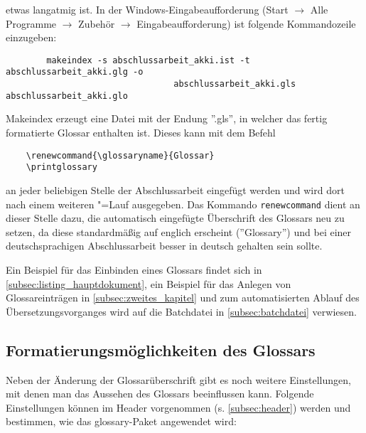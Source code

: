 etwas langatmig ist. In der Windows-Eingabeaufforderung (Start $\rightarrow$ Alle Programme
$\rightarrow$ Zubehör $\rightarrow$ Eingabeaufforderung) ist folgende Kommandozeile einzugeben:
\begin{verbatim}
		makeindex -s abschlussarbeit_akki.ist -t abschlussarbeit_akki.glg -o
								 abschlussarbeit_akki.gls abschlussarbeit_akki.glo
\end{verbatim}
Makeindex erzeugt eine Datei mit der Endung ''.gls'', in welcher das fertig formatierte Glossar
enthalten ist. Dieses kann mit dem Befehl
\begin{verbatim}
	\renewcommand{\glossaryname}{Glossar}
	\printglossary
\end{verbatim}
an jeder beliebigen Stelle der Abschlussarbeit eingefügt werden und wird dort nach einem weiteren
\DMLLaTeX"=Lauf ausgegeben. Das Kommando \texttt{renewcommand} dient an dieser Stelle dazu, die
automatisch eingefügte Überschrift des Glossars neu zu setzen, da diese standardmäßig auf
englich erscheint (''Glossary'') und bei einer deutschsprachigen Abschlussarbeit besser in deutsch
gehalten sein sollte.

Ein Beispiel für das Einbinden eines Glossars findet sich in
\cref{subsec:listing_hauptdokument}, ein Beispiel für das Anlegen von Glossareinträgen in 
\cref{subsec:zweites_kapitel} und zum automatisierten Ablauf des Übersetzungsvorganges wird auf
die Batchdatei in \cref{subsec:batchdatei} verwiesen.

\subsection{Formatierungsmöglichkeiten des Glossars}
Neben der Änderung der Glossarüberschrift gibt es noch weitere Einstellungen, mit denen man das
Aussehen des Glossars beeinflussen kann. Folgende Einstellungen können im Header vorgenommen
(s. \cref{subsec:header}) werden und bestimmen, wie das glossary-Paket angewendet wird:

